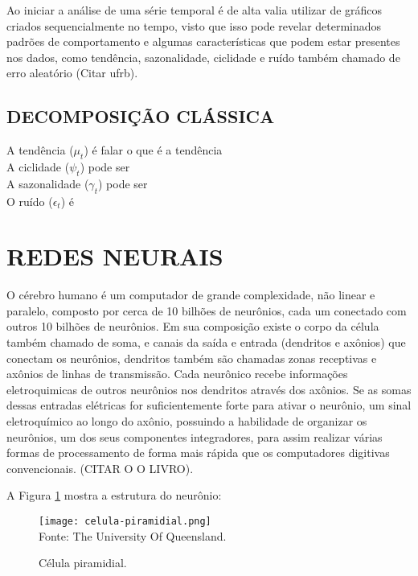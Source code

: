     
    Ao iniciar a análise de uma série temporal é de alta valia utilizar de gráficos criados sequencialmente no tempo,
    visto que isso pode revelar determinados padrões de comportamento e algumas características que podem estar 
    presentes nos dados, como tendência, sazonalidade, ciclidade e ruído também chamado de erro aleatório (Citar ufrb). 

    \subsection{DECOMPOSIÇÃO CLÁSSICA}

        A tendência ($\mu_t$) é falar o que é a tendência \\
        
        A ciclidade ($\psi_t$) pode ser \\
        
        A sazonalidade ($\gamma_t$) pode ser \\
        
        O ruído ($\epsilon_t$) é 




\section{REDES NEURAIS}
    O cérebro humano é um computador de grande complexidade, não linear e paralelo, 
    composto por cerca de 10 bilhões de neurônios, cada um conectado com outros 10 
    bilhões de neurônios. Em sua composição existe o corpo da célula também chamado de 
    soma, e canais da saída e entrada (dendritos e axônios) que conectam os neurônios, 
    dendritos também são chamadas zonas receptivas e axônios de linhas de transmissão. 
    Cada neurônico recebe informações eletroquimicas de outros neurônios nos dendritos 
    através dos axônios. Se as somas dessas entradas elétricas for suficientemente forte 
    para ativar o neurônio, um sinal eletroquímico ao longo do axônio, possuindo a 
    habilidade de organizar os neurônios, um dos seus componentes integradores, para 
    assim realizar várias formas de processamento de forma mais rápida que os 
    computadores digitivas convencionais. (CITAR O O LIVRO).

    A Figura \ref{fig:celula_piramidial} mostra a estrutura do neurônio:
    \begin{figure}[!htb]
        \centering
        \caption{Célula piramidial.}
        \texttt{[image: celula-piramidial.png]}\\
        {\footnotesize Fonte: The University Of Queensland.}\
        \label{fig:celula_piramidial}
    \end{figure}
        
